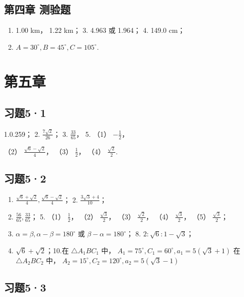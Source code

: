\subsection{第四章 测验题}

\begin{enumerate}[start=2]
\item
  1.00 km， 1.22 km； 3. 4.963 或 1.964； 4. 149.0 cm；
\item
  \(A = 30^{\circ}, B = 45^{\circ}, C = 105^{\circ}\).
\end{enumerate}

\section{第五章}

\subsection{习题5·1}

1.0.259； 2. \(\frac{7\sqrt{2}}{26}\)； 3. \(\frac{33}{65}\)， 5. （1）
\(-\frac{1}{2}\)，

（2） \(\frac{\sqrt{6} - \sqrt{2}}{4}\)， （3） \(\frac{1}{2}\)， （4）
\(\frac{\sqrt{2}}{2}\).

\subsection{习题5·2}

\begin{enumerate}
\item
  \(\frac{\sqrt{6} + \sqrt{2}}{4}, \frac{\sqrt{6} - \sqrt{2}}{4}\)； 2.
  \(\frac{3\sqrt{3} + 4}{10}\)；
\item
  \(\frac{56}{65}, \frac{33}{65}\)； 5. （1） \(\frac{1}{2}\)， （2）
  \(\frac{\sqrt{3}}{2}\)， （3） \(\frac{\sqrt{2}}{2}\)， （4）
  \(\frac{\sqrt{3}}{2}\)， （5） \(\frac{\sqrt{3}}{2}\)；
\item
  \(\alpha = \beta, \alpha - \beta = 180^{\circ}\) 或
  \(\beta - \alpha = 180^{\circ}\)； 8. \(2: \sqrt{6}: 1 - \sqrt{3}\)；
\item
  \(\sqrt{6} +\sqrt{2}\)；10.在 \(\triangle A_{1}BC_{1}\) 中，
  \(A_{1} = 75^{\circ},C_{1} = 60^{\circ},a_{1} = 5(\sqrt{3} +1)\) 在
  \(\triangle A_2BC_2\) 中，
  \(A_{2} = 15^{\circ},C_{2} = 120^{\circ},a_{2} = 5(\sqrt{3} -1)\)
\end{enumerate}

\subsection{习题5·3}

